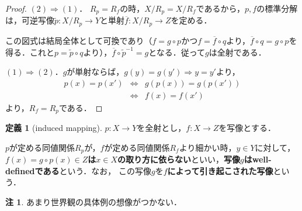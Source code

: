 \documentclass[uplatex, 12pt, dvipdfmx]{jsreport}
\theoremstyle{definition}
\newtheorem{definition}[theorem]{定義}
\newtheorem{remark}[theorem]{注}
\theoremstyle{StatementsWithStar}
\theoremstyle{StatementsWithStar2}
\theoremstyle{StatementsWithStar3}
\theoremstyle{StatementsWithCCirc}
\theoremstyle{definition}
\begin{document}
\begin{proof}
    $(2)\Rightarrow(1)$． $R_p=R_f$の時，$X/R_p=X/R_f$であるから，$p,f$の標準分解は，可逆写像$\tilde{p}:X/R_p\to Y$と単射$\overline{f}:X/R_p\to Z$を定める．
    \begin{center}\end{center}
    この図式は結局全体として可換であり（$f=g\circ p$かつ$f=\overline{f}\circ q$より，$\overline{f}\circ q=g\circ p$を得る．これと$p=\tilde{p}\circ q$より），$\overline{f}\circ\tilde{p}^{-1}=g$となる．従って$g$は全射である．

    $(1)\Rightarrow(2)$．$g$が単射ならば，$g(y)=g(y')\Rightarrow y=y'$より，
    \begin{eqnarray*}
        p(x)=p(x') &\Leftrightarrow& g(p(x))=g(p(x')) \\
        &\Leftrightarrow& f(x)=f(x')
    \end{eqnarray*}
    より，$R_f=R_p$である．
\end{proof}

\begin{definition}[induced mapping]\rm{}
    $p:X\to Y$を全射とし，$f:X\to Z$を写像とする．
    \begin{center}\end{center}
    $p$が定める同値関係$R_p$が，$f$が定める同値関係$R_f$より細かい時，$y\in Y$に対して，\textbf{$f(x)=g\circ p(x)\in Z$は$x\in X$の取り方に依らない}といい，\textbf{写像$g$はwell-definedである}という．なお，
    この写像$g$を\textbf{$f$によって引き起こされた写像}という．
\end{definition}
\begin{remark}
    あまり世界観の具体例の想像がつかない．
\end{remark}
\end{document}
